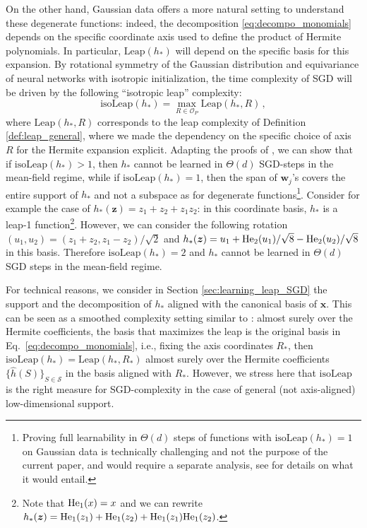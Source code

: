\documentclass[11pt]{article}
\newcommand{\<}{\langle}
\renewcommand{\>}{\rangle}
\theoremstyle{definition}
\def\bw{{\boldsymbol w}}
\def\bx{{\boldsymbol x}}
\def\bz{{\boldsymbol z}}
\def\cO{{\mathcal O}}
\def\cS{{\mathcal S}}
\def\cO{{\mathcal O}}
\def\bz{{\boldsymbol z}}
\def\He{{\rm He}}
\def\bw{{\boldsymbol w}}
\def\bx{{\boldsymbol x}}
\def\bz{{\boldsymbol z}}
\def\He{{\rm He}}
\def\cS{{\mathcal S}}
\begin{document}
On the other hand, Gaussian data offers a more natural setting to understand these degenerate functions: indeed, the decomposition \eqref{eq:decompo_monomials} depends on the specific coordinate axis used to define the product of Hermite polynomials. In particular, $\mathrm{Leap} (h_*)$ will depend on the specific basis for this expansion. By rotational symmetry of the Gaussian distribution and equivariance of neural networks with isotropic initialization, the time complexity of SGD will be driven by the following ``isotropic leap'' complexity:
\[
\mathrm{isoLeap}(h_*) = \max_{R \in \cO_P} \mathrm{Leap}(h_*, R) \, ,
\]
where $\mathrm{Leap}(h_*, R)$ corresponds to the leap complexity of Definition \ref{def:leap_general}, where we made the dependency on the specific choice of axis $R$ for the Hermite expansion explicit. Adapting the proofs of \cite{abbe2022merged}, we can show that if $\mathrm{isoLeap}(h_*) > 1$, then $h_*$ cannot be learned in $\Theta (d) $ SGD-steps in the mean-field regime, while if $\mathrm{isoLeap}(h_*) = 1$, then the span of $\bw_j$'s covers the entire support of $h_*$ and not a subspace as for degenerate functions\footnote{Proving full learnability in $\Theta (d)$ steps of functions with $\mathrm{isoLeap}(h_*) = 1$ on Gaussian data is technically challenging and not the purpose of the current paper, and would require a separate analysis, see \cite{abbe2022merged} for details on what it would entail.}. Consider for example the case of $h_* (\bz) = z_1 + z_2 + z_1z_2$: in this coordinate basis, $h_*$ is a leap-1 function\footnote{Note that $\He_1 (x) = x$ and we can rewrite $h_* (\bz) = \He_1(z_1) + \He_1(z_2) + \He_1(z_1)\He_1(z_2)$.}. However, we can consider the following rotation $(u_1,u_2) = (z_1+z_2, z_1 - z_2)/\sqrt{2}$ and $h_* (\bz) = u_1 + \He_2 (u_1)/\sqrt{8} - \He_2 (u_2)/ \sqrt{8}$ in this basis. Therefore $\mathrm{isoLeap}(h_*) = 2$ and $h_*$ cannot be learned in $\Theta(d)$ SGD steps in the mean-field regime.

For technical reasons, we consider in Section \ref{sec:learning_leap_SGD} the support and the decomposition of $h_*$ aligned with the canonical basis of $\bx$. This can be seen as a smoothed complexity setting similar to \cite{abbe2022merged}: almost surely over the Hermite coefficients, the basis that maximizes the leap is the original basis in Eq.~\eqref{eq:decompo_monomials}, i.e., fixing the axis coordinates $R_*$, then $\mathrm{isoLeap}(h_*) = \mathrm{Leap}(h_*, R_*) $ almost surely over the Hermite coefficients $\{\hat h (S) \}_{S \in \cS}$ in the basis aligned with $R_*$. However, we stress here that $\mathrm{isoLeap}$ is the right measure for SGD-complexity in the case of general (not axis-aligned) low-dimensional support.
\end{document}
